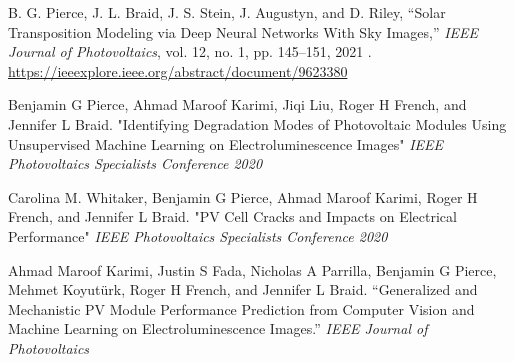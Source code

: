\documentclass[10pt]{article}
\begin{document}
		

	{\begin{newitemize}
        \item{{ B. G. Pierce}, J. L. Braid, J. S. Stein, J. Augustyn, and D. Riley, “Solar Transposition Modeling via Deep Neural Networks With Sky Images,” \textit{IEEE Journal of Photovoltaics}, vol. 12, no. 1, pp. 145–151, 2021 . \href{https://ieeexplore.ieee.org/abstract/document/9623380}{https://ieeexplore.ieee.org/abstract/document/9623380}
        }
		\item{{ Benjamin G Pierce}, Ahmad Maroof Karimi, Jiqi Liu, Roger H French, and Jennifer L Braid. "Identifying Degradation Modes  of Photovoltaic Modules Using Unsupervised Machine Learning on Electroluminescence Images" \textit{IEEE Photovoltaics Specialists Conference 2020}}
		\item{Carolina M. Whitaker, { Benjamin G Pierce}, Ahmad Maroof Karimi, Roger H French, and Jennifer L Braid. "PV Cell Cracks and Impacts on Electrical Performance" \textit{IEEE Photovoltaics Specialists Conference 2020}}
		\item{Ahmad Maroof Karimi, Justin S Fada, Nicholas A Parrilla, { Benjamin G Pierce}, Mehmet Koyutürk, Roger H French, and Jennifer L Braid. “Generalized and Mechanistic PV Module Performance Prediction from Computer Vision and Machine Learning on Electroluminescence Images.” \textit{IEEE Journal of Photovoltaics} }

\end{newitemize}}
\end{document}
